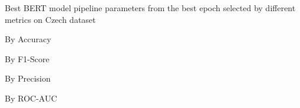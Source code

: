 \begin{table}[!htbp]
    \caption{Best BERT model pipeline parameters from the best epoch selected by different metrics on Czech dataset}
    \label{tab:czech_bert_pipeline_params}
    \centering

    \begin{subtable}[t]{0.48\linewidth}
        \scriptsize
        \caption{By Accuracy}
        
    \end{subtable}
    \hfill
    \begin{subtable}[t]{0.48\linewidth}
        \scriptsize
        \caption{By F1-Score}
        
    \end{subtable}

    \vspace{1em}

    \begin{subtable}[t]{0.48\linewidth}
        \scriptsize
        \caption{By Precision}
        
    \end{subtable}
    \hfill
    \begin{subtable}[t]{0.48\linewidth}
        \scriptsize
        \caption{By ROC-AUC}
        
    \end{subtable}

\end{table}